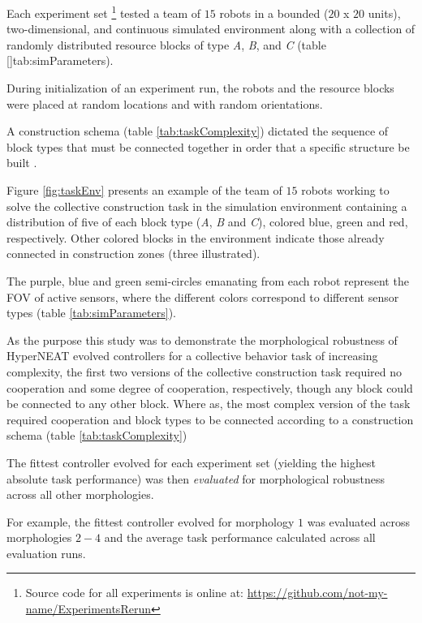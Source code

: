 Each experiment set \footnote{Source code for all experiments is online at: \url{https://github.com/not-my-name/ExperimentsRerun}} tested a team of $15$ robots in a bounded ($20$ x $20$ units), two-dimensional, and continuous simulated environment along with a collection of randomly distributed resource blocks of type \textit{A}, \textit{B}, and \textit{C} (table \ref{}tab:simParameters).

During initialization of an experiment run, the robots and the resource blocks were placed at random locations and with random orientations.

A construction schema (table \ref{tab:taskComplexity}) dictated the sequence of block
types that must be connected together in order that a specific structure be built \cite{NitschkeSaEC2012}.

Figure \ref{fig:taskEnv} presents an example of the team of $15$ robots working to solve the
collective construction task in the simulation environment containing a distribution of five of each
block type (\textit{A}, \textit{B} and \textit{C}), colored blue, green and red, respectively.
Other colored blocks in the environment indicate those already connected in construction zones
(three illustrated).  

The purple, blue and green semi-circles emanating from each robot
represent the FOV of active sensors, where the different colors correspond to different
sensor types (table \ref{tab:simParameters}).

As the purpose this study was to demonstrate the morphological robustness of
HyperNEAT evolved controllers for a collective behavior task of increasing complexity,
the first two versions of the collective construction task required no cooperation and some degree of
cooperation, respectively, though any block could be connected to any other block.
Where as, the most complex version of the task required cooperation and block types
to be connected according to a construction schema (table \ref{tab:taskComplexity})

The fittest controller evolved for each experiment set (yielding the highest absolute task performance)
was then \textit{evaluated} for morphological robustness across all other morphologies.

For example, the fittest controller evolved for morphology $1$ was evaluated across morphologies
$2-4$ and the average task performance calculated across all evaluation runs.

